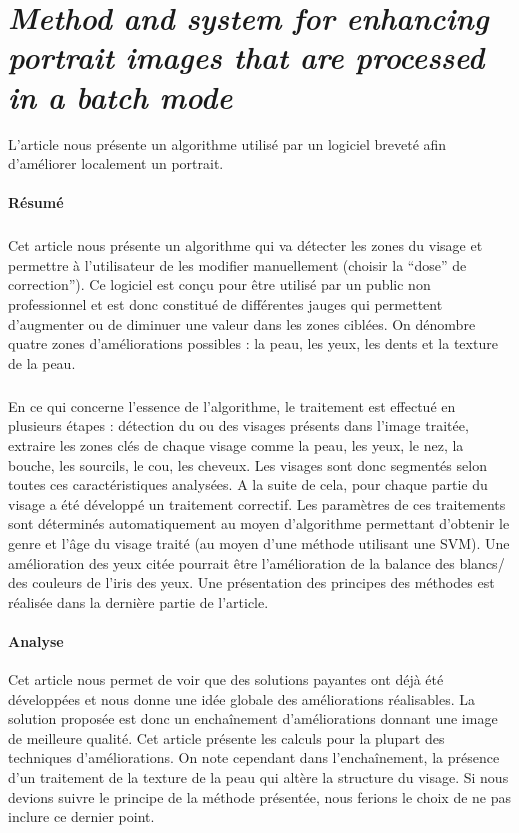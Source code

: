\documentclass[11pt, french,screen]{report-rd-info}
\begin{document}
\section{\emph{Method and system for enhancing portrait images that are processed in a batch mode}}
L'article \cite{Matraszek2004} nous présente un algorithme utilisé par un logiciel breveté afin d'améliorer localement un portrait.
\paragraph{Résumé}
\subparagraph{}
Cet article nous présente un algorithme qui va détecter les zones du visage et permettre à l'utilisateur de les modifier manuellement (choisir la “dose” de correction”). Ce logiciel est conçu pour être utilisé par un public non professionnel et est donc constitué de différentes jauges qui permettent d'augmenter ou de diminuer une valeur dans les zones ciblées. On dénombre quatre zones d'améliorations possibles : la peau, les yeux, les dents et la texture de la peau.
\subparagraph{}
En ce qui concerne l’essence de l’algorithme, le traitement est effectué en plusieurs étapes : détection du ou des visages présents dans l’image traitée, extraire les zones clés de chaque visage comme la peau, les yeux, le nez, la bouche, les sourcils, le cou, les cheveux. Les visages sont donc segmentés selon toutes ces caractéristiques analysées. A la suite de cela, pour chaque partie du visage a été développé un traitement correctif. Les paramètres de ces traitements sont déterminés automatiquement au moyen d’algorithme permettant d’obtenir le genre et l’âge du visage traité (au moyen d’une méthode utilisant une SVM).
Une amélioration des yeux citée pourrait être l’amélioration de la balance des blancs/ des couleurs de l’iris des yeux. Une présentation des principes des méthodes est réalisée dans la dernière partie de l’article.
\paragraph{Analyse}
Cet article nous permet de voir que des solutions payantes ont déjà été développées et nous donne une idée globale des améliorations réalisables. La solution proposée est donc un enchaînement d’améliorations donnant une image de meilleure qualité.
Cet article présente les calculs pour la plupart des techniques d’améliorations. On note cependant dans l'enchaînement, la présence d’un traitement de la texture de la peau qui altère la structure du visage. Si nous devions suivre le principe de la méthode présentée, nous ferions le choix de ne pas inclure ce dernier point.
\end{document}
